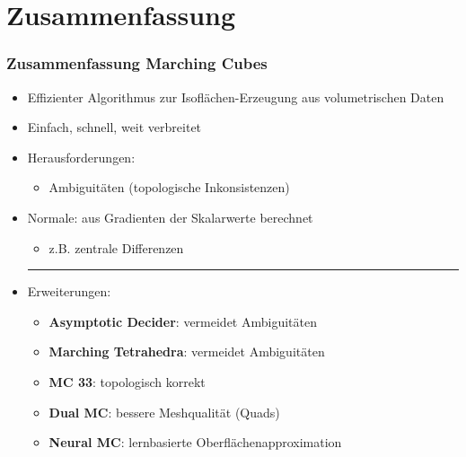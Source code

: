 \documentclass{beamer}
\begin{document}
\section{Zusammenfassung}
\begin{frame}[t]
  \frametitle{Zusammenfassung Marching Cubes}
  \begin{itemize}
    \item Effizienter Algorithmus zur Isoflächen-Erzeugung aus volumetrischen Daten
    \item Einfach, schnell, weit verbreitet %
    \item Herausforderungen:
    \begin{itemize}
      \item Ambiguitäten (topologische Inkonsistenzen)
    \end{itemize}
    \item Normale: aus Gradienten der Skalarwerte berechnet
    \begin{itemize}
      \item z.B. zentrale Differenzen
      \end{itemize}
      \vspace*{-0.3cm}
      \noindent\hspace*{-1em}\rule{\paperwidth}{0.4pt}
    \item Erweiterungen:
    \begin{itemize}
      \item \textbf{Asymptotic Decider}: vermeidet Ambiguitäten
      \item \textbf{Marching Tetrahedra}: vermeidet Ambiguitäten
      \item \textbf{MC 33}: topologisch korrekt
      \item \textbf{Dual MC}: bessere Meshqualität (Quads)
      \item \textbf{Neural MC}: lernbasierte Oberflächenapproximation
    \end{itemize}
  \end{itemize}
\end{frame}
\end{document}
